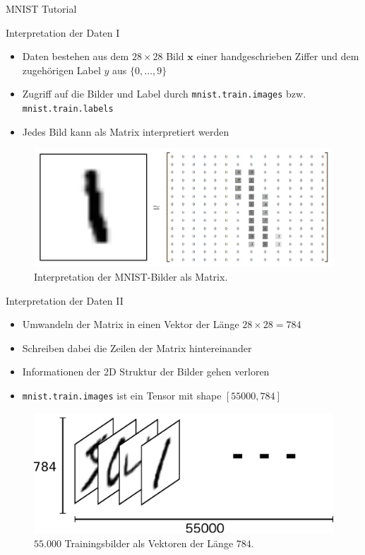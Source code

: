 \documentclass[utf8, smaller, c]{beamer}
\renewcommand{\tt}[1]{{\texttt{#1}}}
\begin{document}
\begin{frame}{MNIST Tutorial}
	\begin{block}{Interpretation der Daten I}
		\footnotesize
		\begin{itemize}
			\item Daten bestehen aus dem $28\times 28$ Bild $\mathbf{x}$ einer handgeschrieben Ziffer und dem zugehörigen
			Label $y$ aus $\{0, \dots, 9\}$
			\item Zugriff auf die Bilder und Label durch \tt{mnist.train.images} bzw. \tt{mnist.train.labels}
			\item Jedes Bild kann als Matrix interpretiert werden
		\end{itemize}
		\begin{figure}[c]
			\includegraphics[scale=0.12]{pics/mnist_matrix}
			\caption{Interpretation der MNIST-Bilder als Matrix.}
		\end{figure}
	\end{block}		
	
	\framebreak
	
	\begin{block}{Interpretation der Daten II}
	\footnotesize
		\begin{itemize}
			\item Umwandeln der Matrix in einen Vektor der Länge $28\times 28 = 784$
			\item Schreiben dabei die Zeilen der Matrix hintereinander
			\item Informationen der 2D Struktur der Bilder gehen verloren
			\item \tt{mnist.train.images} ist ein Tensor mit shape $[55000, 784]$
		\end{itemize}
		\begin{figure}[c]
		\includegraphics[scale=0.085]{pics/mnist_train_xs}
		\caption{$55.000$ Trainingsbilder als Vektoren der Länge $784$.}
		\end{figure}
	\end{block}
	

\end{frame}
\end{document}

